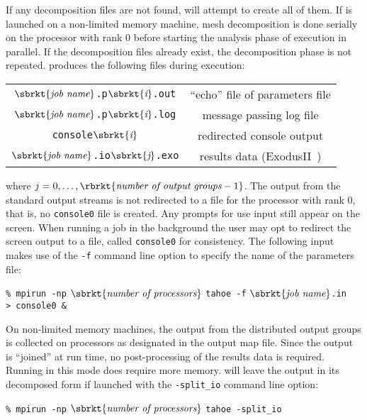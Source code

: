 If any decomposition files are not found, \tahoe will attempt
to create all of them.  If \tahoe is launched on a non-limited memory
machine, mesh decomposition is done serially on the processor with rank 0
before starting the analysis phase of execution in parallel.  If the
decomposition files already exist, the decomposition phase is not repeated. 
\tahoe produces the following files during execution:
\begin{center}
\begin{tabular}[c]{c c}
 \parbox[b]{3.0in}{\raggedleft $\sbrkt{\textit{job name}}$\texttt{.p}$\sbrkt{\textit{i}}$\texttt{.out}}
&\parbox[b]{3.0in}{``echo'' file of parameters file}\\
 \parbox[b]{3.0in}{\raggedleft $\sbrkt{\textit{job name}}$\texttt{.p}$\sbrkt{\textit{i}}$\texttt{.log}}
&\parbox[b]{3.0in}{message passing log file}\\
 \parbox[b]{3.0in}{\raggedleft \texttt{console}$\sbrkt{\textit{i}}$}
&\parbox[b]{3.0in}{redirected console output}\\
 \parbox[b]{3.0in}{\raggedleft $\sbrkt{\textit{job name}}$\texttt{.io}$\sbrkt{\textit{j}}$\texttt{.exo}}
&\parbox[b]{3.0in}{results data (\textsf{ExodusII}~\cite{ExodusII})}
\end{tabular}
\end{center}
where $j = 0,\ldots,\rbrkt{\textit{number of output groups} - 1}$.
The output from the
standard output streams is not redirected to a file for the processor with
rank 0, that is, no \texttt{console0} file is created.  Any prompts for use input
still appear on the screen.  When running a job in the background the user
may opt to redirect the screen output to a file, called \texttt{console0} for
consistency.  The following input makes use of the \texttt{-f} command line option
to specify the name of the parameters file:
\begin{center}
\texttt{\% mpirun -np} $\sbrkt{\textit{number of processors}}$ \texttt{tahoe -f}
$\sbrkt{\textit{job name}}$\texttt{.in \textgreater~console0 \&}
\end{center}
On non-limited memory machines, the output from the distributed output
groups is collected on processors as designated in the output map file. 
Since the output is ``joined'' at run time, no post-processing of the results
data is required.  Running \tahoe in this mode does require more memory. 
\tahoe will leave the output in its decomposed form if launched with the
\texttt{-split\_io} command line option:
\begin{center}
\texttt{\% mpirun -np} $\sbrkt{\textit{number of processors}}$ \texttt{tahoe -split\_io}
\end{center}
